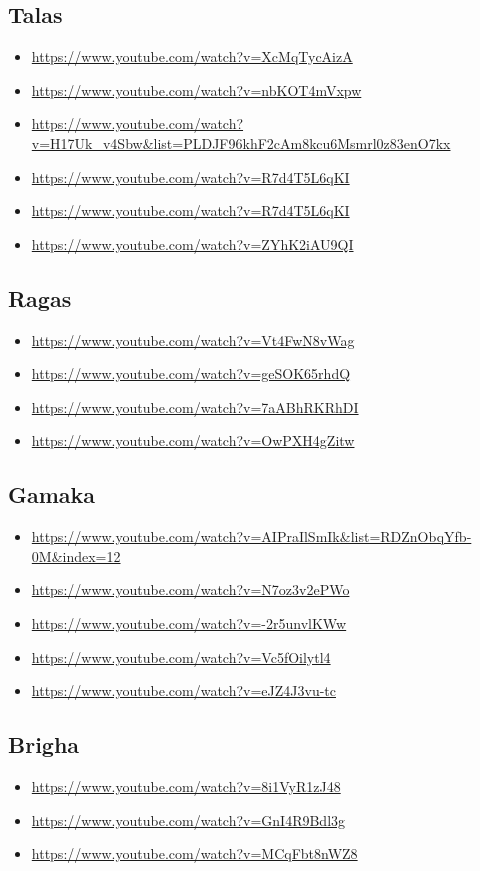 \subsection{Talas}
\label{sec:orgfdae831}
\begin{itemize}
\item \url{https://www.youtube.com/watch?v=XcMqTycAizA}
\item \url{https://www.youtube.com/watch?v=nbKOT4mVxpw}
\item \url{https://www.youtube.com/watch?v=H17Uk\_v4Sbw\&list=PLDJF96khF2cAm8kcu6Msmrl0z83enO7kx}
\item \url{https://www.youtube.com/watch?v=R7d4T5L6qKI}
\item \url{https://www.youtube.com/watch?v=R7d4T5L6qKI}
\item \url{https://www.youtube.com/watch?v=ZYhK2iAU9QI}
\end{itemize}

\subsection{Ragas}
\label{sec:org471f93a}
\begin{itemize}
\item \url{https://www.youtube.com/watch?v=Vt4FwN8vWag}
\item \url{https://www.youtube.com/watch?v=geSOK65rhdQ}
\item \url{https://www.youtube.com/watch?v=7aABhRKRhDI}
\item \url{https://www.youtube.com/watch?v=OwPXH4gZitw}
\end{itemize}

\subsection{Gamaka}
\label{sec:org6a76645}
\begin{itemize}
\item \url{https://www.youtube.com/watch?v=AIPraIlSmIk\&list=RDZnObqYfb-0M\&index=12}
\item \url{https://www.youtube.com/watch?v=N7oz3v2ePWo}
\item \url{https://www.youtube.com/watch?v=-2r5unvlKWw}
\item \url{https://www.youtube.com/watch?v=Vc5fOilytl4}
\item \url{https://www.youtube.com/watch?v=eJZ4J3vu-tc}
\end{itemize}

\subsection{Brigha}
\label{sec:org86886e5}
\begin{itemize}
\item \url{https://www.youtube.com/watch?v=8i1VyR1zJ48}
\item \url{https://www.youtube.com/watch?v=GnI4R9Bdl3g}
\item \url{https://www.youtube.com/watch?v=MCqFbt8nWZ8}
\end{itemize}

